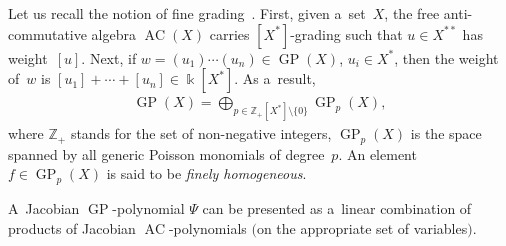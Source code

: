 Let us recall the notion of f\/ine grading~\cite{FarkasI}.
First, given a~set~$X$, the free anti-commutative algebra $\operatorname{AC}(X)$ carries $[X^*]$-grading such that $u\in X^{**}$ has weight~$[u]$.
Next, if $w = (u_1)\cdots (u_n)\in \operatorname{GP}(X)$, $u_i\in X^{*}$, then the weight of~$w$ is $[u_1]+\cdots + [u_n]\in \Bbbk [X^*]$.
As a~result,
\begin{gather*}
\operatorname{GP}(X) = \bigoplus\limits_{p\in \mathbb Z_+ [X^*]\setminus \{0\}} \operatorname{GP}_p(X),
\end{gather*}
where $\mathbb Z_+$ stands for the set of non-negative integers, $\operatorname{GP}_p(X)$ is the space spanned by all generic Poisson
monomials of degree~$p$.
An element $f\in \operatorname{GP}_p(X)$ is said to be {\em finely homogeneous}.

\begin{proposition}
A~Jacobian $\operatorname{GP}$-polynomial $\Psi $ can be presented as a~linear combination of products of Jacobian $\operatorname{AC}$-polynomials $($on the
appropriate set of variables$)$.
\end{proposition}

